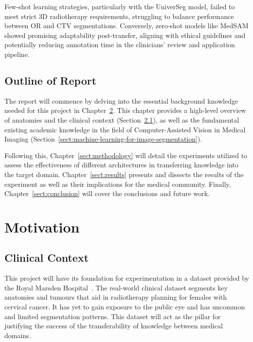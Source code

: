 \documentclass[11pt,twoside]{report}
\begin{document}
Few-shot learning strategies, particularly with the UniverSeg model, failed to meet strict 3D radiotherapy requirements, struggling to balance performance between OR and CTV segmentations. Conversely, zero-shot models like MedSAM showed promising adaptability post-transfer, aligning with ethical guidelines and potentially reducing annotation time in the clinicians' review and application pipeline.

\section{Outline of Report}

The report will commence by delving into the essential background knowledge needed for this project in Chapter~\ref{sect:motivation}. This chapter provides a high-level overview of anatomies and the clinical context (Section~\ref{sect:clinical-context}), as well as the fundamental existing academic knowledge in the field of Computer-Assisted Vision in Medical Imaging (Section~\ref{sect:machine-learning-for-image-segmentation}).

Following this, Chapter~\ref{sect:methodology} will detail the experiments utilized to assess the effectiveness of different architectures in transferring knowledge into the target domain. Chapter~\ref{sect:results} presents and dissects the results of the experiment as well as their implications for the medical community. Finally, Chapter~\ref{sect:conclusion} will cover the conclusions and future work.

\chapter{Motivation}\label{sect:motivation}

\section{Clinical Context}\label{sect:clinical-context}

This project will have its foundation for experimentation in a dataset provided by the Royal Marsden Hospital~\cite{AMLART-data}. The real-world clinical dataset segments key anatomies and tumours that aid in radiotherapy planning for females with cervical cancer. It has yet to gain exposure to the public eye and has uncommon and limited segmentation patterns. This dataset will act as the pillar for justifying the success of the transferability of knowledge between medical domains.
\end{document}
